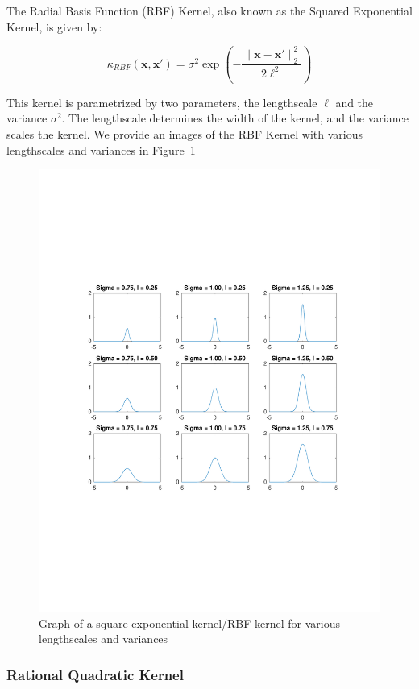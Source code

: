 \documentclass{article}
\newcommand{\bx}{\boldsymbol{x}}
\begin{document}
The Radial Basis Function (RBF) Kernel, also known as the Squared Exponential Kernel, is given by:

\[
  \kappa_{RBF}(\bx, \bx') = \sigma^2 \exp\left( - \frac{\|\bx -\bx' \|_{2}^{2}}{2 \ell^2} \right)
\]

This kernel is parametrized by two parameters, the lengthscale $\ell$ and the variance $\sigma^2$. The lengthscale
determines the width of the kernel, and the variance scales the kernel\cite{duvenaud_automatic_2014}. We provide an
images of the RBF Kernel with various lengthscales and variances in Figure~\ref{fig:square_exp_kernel}

\begin{figure}[H]
  \centering
  \caption{Graph of a square exponential kernel/RBF kernel for various lengthscales and variances}
  \label{fig:square_exp_kernel}
  \includegraphics[trim={0 7cm 0 7cm},clip,width=\textwidth]{square_exp_kernel}
\end{figure}

\subsubsection{Rational Quadratic Kernel}
\end{document}
